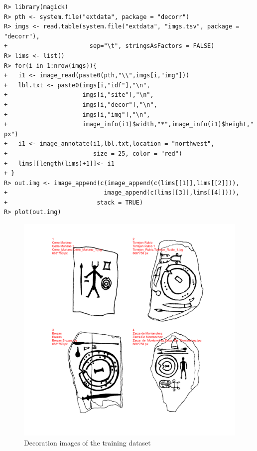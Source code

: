 \documentclass[article]{jss}\usepackage{knitr}
\begin{document}
\begin{kframe}
\begin{verbatim}
R> library(magick)
R> pth <- system.file("extdata", package = "decorr")
R> imgs <- read.table(system.file("extdata", "imgs.tsv", package = "decorr"),
+                       sep="\t", stringsAsFactors = FALSE)
R> lims <- list()
R> for(i in 1:nrow(imgs)){
+   i1 <- image_read(paste0(pth,"\\",imgs[i,"img"]))
+   lbl.txt <- paste0(imgs[i,"idf"],"\n",
+                     imgs[i,"site"],"\n",
+                     imgs[i,"decor"],"\n",
+                     imgs[i,"img"],"\n",
+                     image_info(i1)$width,"*",image_info(i1)$height," px")
+   i1 <- image_annotate(i1,lbl.txt,location = "northwest",
+                        size = 25, color = "red")
+   lims[[length(lims)+1]]<- i1
+ }
R> out.img <- image_append(c(image_append(c(lims[[1]],lims[[2]])),
+                           image_append(c(lims[[3]],lims[[4]]))),
+                         stack = TRUE)
R> plot(out.img)
\end{verbatim}
\end{kframe}\begin{figure}[H]

{\centering \includegraphics[width=\maxwidth]{figure/unnamed-chunk-4-1} 

}

\caption{\label{fig:figs}Decoration images of the training dataset}\label{fig:unnamed-chunk-4}
\end{figure}
\end{document}
